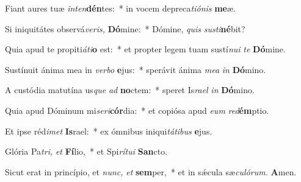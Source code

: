 \item Fiant aures tuæ \textit{inten}\textbf{dén}tes:~* in vocem depreca\tinyhspace\textit{tiónis} \textbf{me}æ.
\item Si iniquitátes observá\tinyhspace\textit{veris,} \textbf{Dó}mine:~* Dómine, \textit{quis} \textit{susti}\textbf{né}bit?
\item Quia apud te propiti\tinyhspace\textit{áti}\textbf{o} est:~* et propter legem tuam sustí\textit{nui} \textit{te} \textbf{Dó}mine.
\item Sustínuit ánima mea in \textit{verbo} \textbf{e}jus:~* sperávit ánima \textit{mea} \textit{in} \textbf{Dó}mino.
\item A custódia matutína us\tinyhspace\textit{que} \textit{ad} \textbf{no}ctem:~* speret Is\tinyhspace\textit{rael} \textit{in} \textbf{Dó}mino.
\item Quia apud Dóminum mi\tinyhspace\textit{seri}\textbf{cór}dia:~* et copiósa apud \textit{eum} \textit{red}\textbf{ém}ptio.
\item Et ipse réd\tinyhspace\textit{imet} \textbf{Is}rael:~* ex ómnibus iniqui\tinyhspace\textit{tátibus} \textbf{e}jus.
\item Glória Pa\tinyhspace\textit{tri,} \textit{et} \textbf{Fí}lio,~* et Spi\tinyhspace\textit{rítui} \textbf{San}cto.
\item Sicut erat in princípio, et \textit{nunc,} \textit{et} \textbf{sem}per,~* et in sǽcula sæ\tinyhspace\textit{culórum.} \textbf{A}men.
